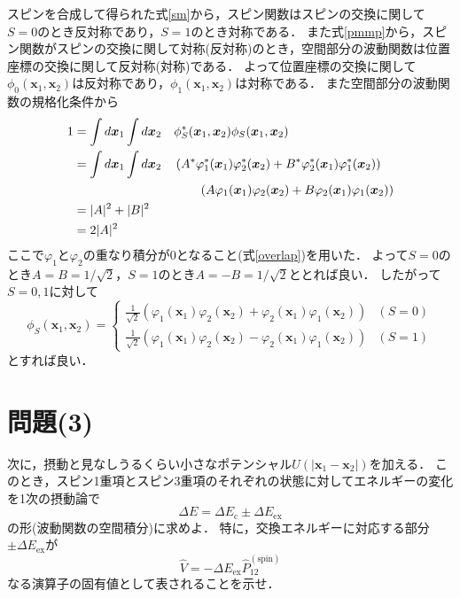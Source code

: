 \documentclass[a4paper,11pt]{jsarticle}
\begin{document}
スピンを合成して得られた式\eqref{sm}から，スピン関数はスピンの交換に関して$S=0$のとき反対称であり，$S=1$のとき対称である．
また式\eqref{pmmp}から，スピン関数がスピンの交換に関して対称(反対称)のとき，空間部分の波動関数は位置座標の交換に関して反対称(対称)である．
よって位置座標の交換に関して$\phi_0(\bm{x}_1,\bm{x}_2)$は反対称であり，$\phi_1(\bm{x}_1,\bm{x}_2)$は対称である．
また空間部分の波動関数の規格化条件から
\begin{alignat}{2}
  1 &= \int d\bm{x}_1 \int d\bm{x}_2 &&\phi^*_S(\bm{x}_1, \bm{x}_2) \phi_S(\bm{x}_1, \bm{x}_2) \notag\\
  &= \int d\bm{x}_1 \int d\bm{x}_2 &&\left(A^*\varphi^*_1 (\bm{x}_1)\varphi^*_2 (\bm{x}_2) + B^*\varphi^*_2(\bm{x}_1)\varphi^*_1 (\bm{x}_2)\right) \notag\\ 
  &&& \qquad \left(A\varphi_1(\bm{x}_1)\varphi_2(\bm{x}_2) + B \varphi_2(\bm{x}_1)\varphi_1(\bm{x}_2)\right) \notag\\
  &= \lvert A \rvert^2 + \lvert B \rvert^2 \notag\\
  &= 2\lvert A \rvert^2
\end{alignat}
ここで$\varphi_1$と$\varphi_2$の重なり積分が0となること(式\eqref{overlap})を用いた．
よって$S=0$のとき$A=B=1/\sqrt{2}$，$S=1$のとき$A=-B=1/\sqrt{2}$ととれば良い．
したがって$S=0,1$に対して
\begin{equation}
  \phi_S(\bm{x}_1, \bm{x}_2) 
  = \left\{
  \begin{array}{ll}
    \frac{1}{\sqrt{2}}\left(\varphi_1(\bm{x}_1)\varphi_2(\bm{x}_2) + \varphi_2(\bm{x}_1)\varphi_1(\bm{x}_2)\right) & (S = 0)\\
    \frac{1}{\sqrt{2}}\left(\varphi_1(\bm{x}_1)\varphi_2(\bm{x}_2) - \varphi_2(\bm{x}_1)\varphi_1(\bm{x}_2)\right) & (S = 1)
  \end{array}
  \right.
\end{equation}
とすれば良い．

\section{問題(3)}
\begin{tcolorbox}[title=問題(3)]
  次に，摂動と見なしうるくらい小さなポテンシャル$U(\lvert \bm{x}_1 - \bm{x}_2\rvert)$を加える．
  このとき，スピン1重項とスピン3重項のそれぞれの状態に対してエネルギーの変化を1次の摂動論で
  \begin{equation}
    \Delta E = \Delta E_{\mathrm{c}} \pm \Delta E_{\mathrm{ex}}
  \end{equation}
  の形(波動関数の空間積分)に求めよ．
  特に，交換エネルギーに対応する部分$\pm \Delta E_{\mathrm{ex}}$が
  \begin{equation}
    \hat{V} = - \Delta E_{\mathrm{ex}} \hat{P}^{(\mathrm{spin})}_{12} 
  \end{equation}
  なる演算子の固有値として表されることを示せ．
\end{tcolorbox}
\end{document}
